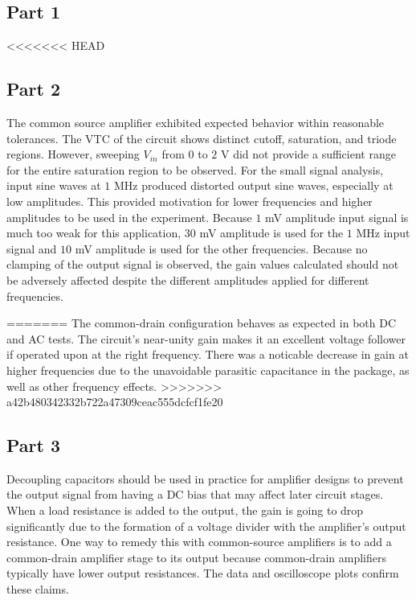 \subsection{Part 1}
<<<<<<< HEAD


\subsection{Part 2}
The common source amplifier exhibited expected behavior within reasonable tolerances.
The VTC of the circuit shows distinct cutoff, saturation, and triode regions.
However, sweeping $V_{in}$ from $0$ to $2$ \si{\volt} did not provide a sufficient range for the entire saturation region to be observed. 
For the small signal analysis, input sine waves at $1$ \si{\mega\hertz} produced distorted output sine waves, especially at low amplitudes. 
This provided motivation for lower frequencies and higher amplitudes to be used in the experiment.
Because $1$ \si{\milli\volt} amplitude input signal is much too weak for this application, $30$ \si{\milli\volt} amplitude is used for the $1$ \si{\mega\hertz} input signal and $10$ \si{\milli\volt} amplitude is used for the other frequencies.
Because no clamping of the output signal is observed, the gain values calculated should not be adversely affected despite the different amplitudes applied for different frequencies.

=======
The common-drain configuration behaves as expected in both DC and AC tests. The circuit's near-unity gain makes it an excellent voltage follower if operated upon at the right frequency.
There was a noticable decrease in gain at higher frequencies due to the unavoidable parasitic capacitance in the package, as well as other frequency effects.
>>>>>>> a42b480342332b722a47309ceac555dcfcf1fe20
\subsection{Part 3}
Decoupling capacitors should be used in practice for amplifier designs to prevent the output signal from having a DC bias that may affect later circuit stages.
When a load resistance is added to the output, the gain is going to drop significantly due to the formation of a voltage divider with the amplifier's output resistance.
One way to remedy this with common-source amplifiers is to add a common-drain amplifier stage to its output because common-drain amplifiers typically have lower output resistances.
The data and oscilloscope plots confirm these claims.
